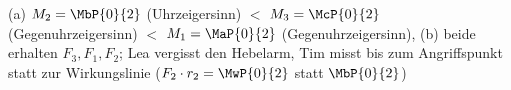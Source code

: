 (a) $M_2 = \MbP{0}{2}$ (Uhrzeigersinn) $<$ $M_3 = \McP{0}{2}$ (Gegenuhrzeigersinn) $<$ $M_1 = \MaP{0}{2}$ (Gegenuhrzeigersinn), (b) beide erhalten $F_3, F_1, F_2$; Lea vergisst den Hebelarm, Tim misst bis zum Angriffspunkt statt zur Wirkungslinie ($F_2\cdot r_2 = \MwP{0}{2}$ statt $\MbP{0}{2}$)
